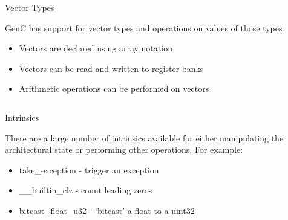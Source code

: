 \begin{frame}[fragile]{Vector Types}

GenC has support for vector types and operations on values of those types
\begin{itemize}
\item \alert<2>{Vectors are declared using array notation}
\item \alert<3>{Vectors can be read and written to register banks}
\item \alert<4>{Arithmetic operations can be performed on vectors}
\end{itemize}

\begin{columns}
\begin{column}{0.99\textwidth}
\centering
{}
\end{column}
\begin{column}{0.01\textwidth}
\vspace{0.3\textheight}
\end{column}
\end{columns}

\end{frame}

\begin{frame}[fragile]{Intrinsics}

There are a large number of intrinsics available for either manipulating
the architectural state or performing other operations. For example:

\begin{itemize}
\item {\ttfamily take\_exception} - trigger an exception
\item {\ttfamily \_\_builtin\_clz} - count leading zeros
\item {\ttfamily bitcast\_float\_u32} - `bitcast' a float to a uint32
\end{itemize}

\end{frame}
